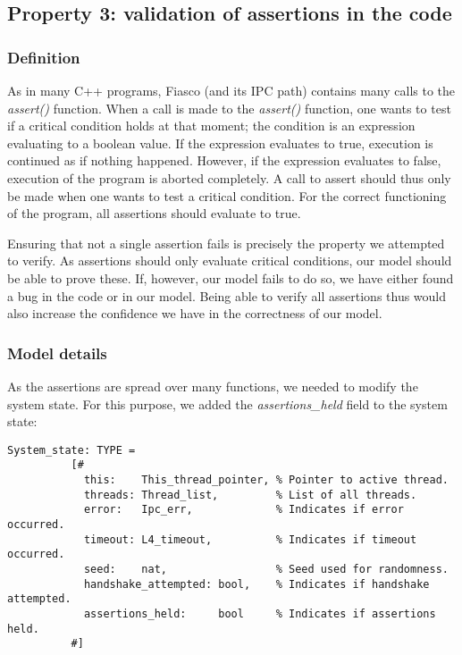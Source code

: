 \subsection{Property 3: validation of assertions in the code}

\subsubsection{Definition}
As in many C++ programs, Fiasco (and its IPC path) contains many calls to the \emph{assert()} function. When a call is made to the \emph{assert()} function, one wants to test if a critical condition holds at that moment; the condition is an expression evaluating to a boolean value. If the expression evaluates to true, execution is continued as if nothing happened. However, if the expression evaluates to false, execution of the program is aborted completely. A call to assert should thus only be made when one wants to test a critical condition. For the correct functioning of the program, all assertions should evaluate to true.\emptyline

Ensuring that not a single assertion fails is precisely the property we attempted to verify. As assertions should only evaluate critical conditions, our model should be able to prove these. If, however, our model fails to do so, we have either found a bug in the code or in our model. Being able to verify all assertions thus would also increase the confidence we have in the correctness of our model.

\subsubsection{Model details}
As the assertions are spread over many functions, we needed to modify the system state. For this purpose, we added the \emph{assertions\_held} field to the system state:

\lstset{language=PVS}
\begin{lstlisting}[caption={PVS: basic system state, with added \emph{assertions\_held} field.}]
System_state: TYPE = 
          [# 
            this:    This_thread_pointer, % Pointer to active thread.
            threads: Thread_list,         % List of all threads.
            error:   Ipc_err,             % Indicates if error occurred.
            timeout: L4_timeout,          % Indicates if timeout occurred.
            seed:    nat,                 % Seed used for randomness.
            handshake_attempted: bool,    % Indicates if handshake attempted.
            assertions_held:     bool     % Indicates if assertions held.
          #]
\end{lstlisting}

